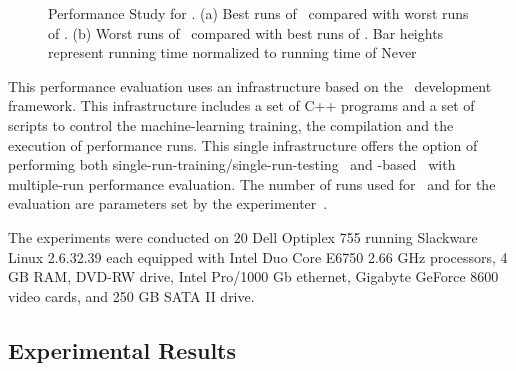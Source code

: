 \begin{figure}
\begin{center}
  \end{center}
 \caption{Performance Study for \gcc. (a) Best runs of \FDI\ compared with worst runs of \llvm.  (b) Worst runs of \FDI\ compared with best runs of \llvm. Bar heights represent running time normalized to running time of Never}
  \label{fig:BestWorstComparison}
\end{figure}

This performance evaluation uses an infrastructure based on the \llvm\ development framework. This infrastructure includes a set of C++ programs and a set of scripts to control the machine-learning training, the compilation and the execution of performance runs. This single infrastructure offers the option of performing both single-run-training/single-run-testing \FDO\ and  \CP-based \FDO\ with multiple-run performance evaluation. The number of runs used for \CP\ and for the evaluation are parameters set by the experimenter~\cite{BerubePhD}.


The experiments were conducted on $20$ Dell Optiplex 755 running Slackware Linux 2.6.32.39 each equipped with Intel Duo Core E6750 2.66 GHz processors, 4 GB RAM, DVD-RW drive, Intel Pro/1000 Gb ethernet, Gigabyte GeForce 8600 video cards, and 250 GB SATA II drive. 

\subsection {Experimental Results}

